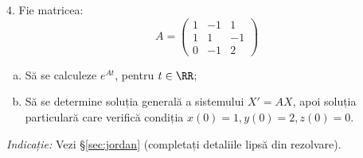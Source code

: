 \vspace{1cm}

4. Fie matricea:
\[
  A = \begin{pmatrix}
    1 & -1 & 1 \\
    1 & 1 & -1 \\
    0 & -1 & 2 
  \end{pmatrix}
\]
\begin{enumerate}[(a)]
\item Să se calculeze $e^{At}$, pentru $t \in \RR$;
\item Să se determine soluția generală a sistemului $X' = AX$, apoi soluția particulară
  care verifică condiția $x(0) = 1, y(0) = 2, z(0) = 0$.
\end{enumerate}

\emph{Indicație:} Vezi \S\ref{sec:jordan} (completați detaliile lipsă din rezolvare).


